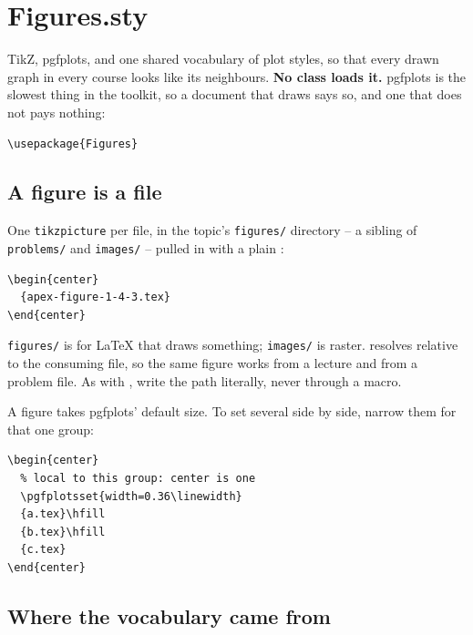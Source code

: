 \section{Figures.sty}\label{sec:ref-figures}

TikZ, pgfplots, and one shared vocabulary of plot styles, so that every
drawn graph in every course looks like its neighbours. \textbf{No class
loads it.} pgfplots is the slowest thing in the toolkit, so a document
that draws says so, and one that does not pays nothing:

\begin{verbatim}
\usepackage{Figures}
\end{verbatim}

\subsection*{A figure is a file}

One \texttt{tikzpicture} per file, in the topic's \texttt{figures/}
directory -- a sibling of \texttt{problems/} and \texttt{images/} -- pulled
in with a plain :

\begin{verbatim}
\begin{center}
  {apex-figure-1-4-3.tex}
\end{center}
\end{verbatim}

\texttt{figures/} is for \LaTeX{} that draws something; \texttt{images/}
is raster.  resolves relative to the consuming file, so the same
figure works from a lecture and from a problem file. As with
, write the path literally, never through a macro.

A figure takes pgfplots' default size. To set several side by side, narrow
them for that one group:

\begin{verbatim}
\begin{center}
  % local to this group: center is one
  \pgfplotsset{width=0.36\linewidth}
  {a.tex}\hfill
  {b.tex}\hfill
  {c.tex}
\end{center}
\end{verbatim}

\subsection*{Where the vocabulary came from}

